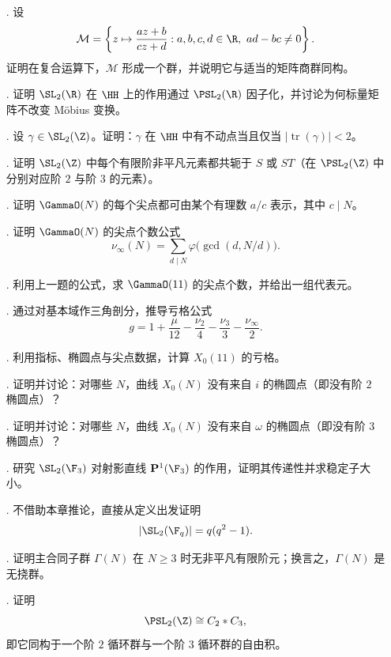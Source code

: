 \begin{enumerate}
  \item[\hard 51.] 设
  \[
  \mathcal M=\left\{z\mapsto \frac{az+b}{cz+d}:a,b,c,d\in\R,\ ad-bc\ne 0\right\}.
  \]
  证明在复合运算下，$\mathcal M$ 形成一个群，并说明它与适当的矩阵商群同构。
  \item[\hard 52.] 证明 $\SL_2(\R)$ 在 $\HH$ 上的作用通过 $\PSL_2(\R)$ 因子化，并讨论为何标量矩阵不改变 Möbius 变换。
  \item[\hard 53.] 设 $\gamma\in\SL_2(\Z)$。证明：$\gamma$ 在 $\HH$ 中有不动点当且仅当 $|\operatorname{tr}(\gamma)|<2$。
  \item[\hard 54.] 证明 $\SL_2(\Z)$ 中每个有限阶非平凡元素都共轭于 $S$ 或 $ST$（在 $\PSL_2(\Z)$ 中分别对应阶 $2$ 与阶 $3$ 的元素）。
  \item[\hard 55.] 证明 $\GammaO(N)$ 的每个尖点都可由某个有理数 $a/c$ 表示，其中 $c\mid N$。
  \item[\hard 56.] 证明 $\GammaO(N)$ 的尖点个数公式
  \[
  \nu_{\infty}(N)=\sum_{d\mid N}\varphi\bigl(\gcd(d,N/d)\bigr).
  \]
  \item[\hard 57.] 利用上一题的公式，求 $\GammaO(11)$ 的尖点个数，并给出一组代表元。
  \item[\hard 58.] 通过对基本域作三角剖分，推导亏格公式
  \[
  g=1+\frac{\mu}{12}-\frac{\nu_2}{4}-\frac{\nu_3}{3}-\frac{\nu_{\infty}}{2}.
  \]
  \item[\hard 59.] 利用指标、椭圆点与尖点数据，计算 $X_0(11)$ 的亏格。
  \item[\hard 60.] 证明并讨论：对哪些 $N$，曲线 $X_0(N)$ 没有来自 $i$ 的椭圆点（即没有阶 $2$ 椭圆点）？
  \item[\hard 61.] 证明并讨论：对哪些 $N$，曲线 $X_0(N)$ 没有来自 $\omega$ 的椭圆点（即没有阶 $3$ 椭圆点）？
  \item[\hard 62.] 研究 $\SL_2(\F_3)$ 对射影直线 $\mathbf P^1(\F_3)$ 的作用，证明其传递性并求稳定子大小。
  \item[\hard 63.] 不借助本章推论，直接从定义出发证明
  \[
  |\SL_2(\F_q)|=q(q^2-1).
  \]
  \item[\hard 64.] 证明主合同子群 $\Gamma(N)$ 在 $N\ge 3$ 时无非平凡有限阶元；换言之，$\Gamma(N)$ 是无挠群。
  \item[\hard 65.] 证明
  \[
  \PSL_2(\Z)\cong C_2\ast C_3,
  \]
  即它同构于一个阶 $2$ 循环群与一个阶 $3$ 循环群的自由积。
\end{enumerate}

